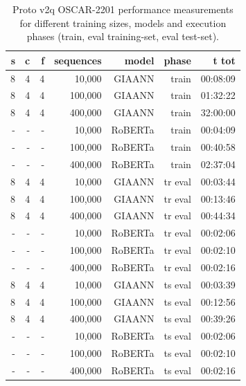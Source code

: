 \begin{table}[H]
\centering
\caption{Proto v2q OSCAR-2201 performance measurements for different training sizes, models and execution phases (train, eval training-set, eval test-set).}
\label{tab:protov2q-oscar-performance-models-inferenceLeakyIntegrateAndFire}
\begin{tabular}{rrrrrrr}
\toprule
\textbf{s} & \textbf{c} & \textbf{f} & \textbf{sequences} & \textbf{model} & \textbf{phase} & \textbf{t tot} \\
\midrule
8 & 4 & 4 & 10,000  & GIAANN  & train   & 00:08:09 \\
8 & 4 & 4 & 100,000 & GIAANN  & train   & 01:32:22 \\
8 & 4 & 4 & 400,000 & GIAANN  & train   & 32:00:00 \\
- & - & - & 10,000  & RoBERTa & train   & 00:04:09 \\
- & - & - & 100,000 & RoBERTa & train   & 00:40:58 \\
- & - & - & 400,000 & RoBERTa & train   & 02:37:04 \\
8 & 4 & 4 & 10,000  & GIAANN  & tr eval & 00:03:44 \\
8 & 4 & 4 & 100,000 & GIAANN  & tr eval & 00:13:46 \\
8 & 4 & 4 & 400,000 & GIAANN  & tr eval & 00:44:34 \\
- & - & - & 10,000  & RoBERTa & tr eval & 00:02:06 \\
- & - & - & 100,000 & RoBERTa & tr eval & 00:02:10 \\
- & - & - & 400,000 & RoBERTa & tr eval & 00:02:16 \\
8 & 4 & 4 & 10,000  & GIAANN  & ts eval & 00:03:39 \\
8 & 4 & 4 & 100,000 & GIAANN  & ts eval & 00:12:56 \\
8 & 4 & 4 & 400,000 & GIAANN  & ts eval & 00:39:26 \\
- & - & - & 10,000  & RoBERTa & ts eval & 00:02:06 \\
- & - & - & 100,000 & RoBERTa & ts eval & 00:02:10 \\
- & - & - & 400,000 & RoBERTa & ts eval & 00:02:16 \\
\bottomrule
\end{tabular}
\end{table}


